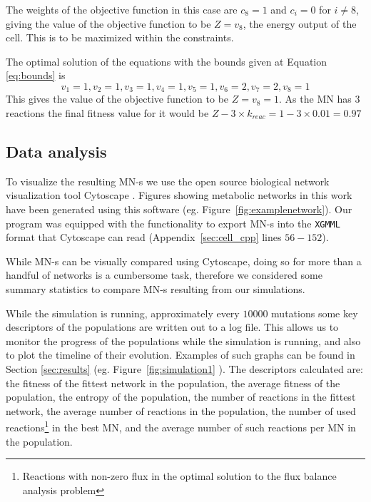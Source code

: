 \documentclass[a4paper,12pt]{article}
\begin{document}
	The weights of the objective function in this case are $c_8=1$ and $c_i=0$ for $i\neq 8$, giving the value of the objective function to be $Z=v_8$, the energy output of the cell. This is to be maximized within the constraints.

	The optimal solution of the equations with the bounds given at Equation \ref{eq:bounds} is 
	\begin{equation}\label{eq:solution}
		v_1=1 , v_2=1, v_3=1, v_4=1, v_5=1, v_6=2, v_7=2, v_8=1
	\end{equation}
	This gives the value of the objective function to be $Z=v_8=1$. As the MN has $3$ reactions the final fitness value for it would be $Z-3\times k_{reac}=1-3\times 0.01=0.97$
\subsection{Data analysis}
\label{sub:visualization}

To visualize the resulting MN-s we use the open source biological network visualization tool Cytoscape \cite{cytoscape}. Figures showing metabolic networks in this work have been generated using this software (eg. Figure~\ref{fig:examplenetwork}). Our program was equipped with the functionality to export MN-s into the \texttt{XGMML} format that Cytoscape can read (Appendix~\ref{sec:cell_cpp} lines $56-152$). 

While MN-s can be visually compared using Cytoscape, doing so for more than a handful of networks is a cumbersome task, therefore we considered some summary statistics to compare MN-s resulting from our simulations.

While the simulation is running, approximately every $10000$ mutations some key descriptors of the populations are written out to a log file. This allows us to monitor the progress of the populations while the simulation is running, and also to plot the timeline of their evolution. Examples of such graphs can be found in Section \ref{sec:results} (eg. Figure~\ref{fig:simulation1} ). The descriptors calculated are: the fitness of the fittest network in the population, the average fitness of the population, the entropy of the population, the number of reactions in the fittest network, the average number of reactions in the population, the number of used reactions\footnote{Reactions with non-zero flux in the optimal solution to the flux balance analysis problem} in the best MN, and the average number of such reactions per MN in the population. 
\end{document}
